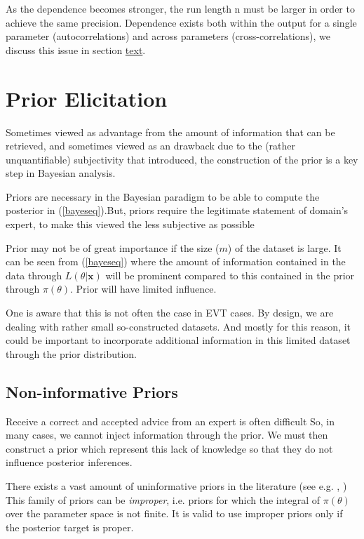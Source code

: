 \documentclass[11pt,a4paper,openany ]{book}
\begin{document}
As the dependence becomes stronger, the run length n must be larger in order
to achieve the same precision. Dependence exists both within the output for a single parameter
(autocorrelations) and across parameters (cross-correlations), we discuss this issue in section \hyperref[label]{text}.




\section{Prior Elicitation}

Sometimes viewed as advantage from the amount of information that can be retrieved, and sometimes viewed as an drawback due to the (rather unquantifiable) subjectivity that introduced, the construction of the prior is a key step in Bayesian analysis.


Priors are necessary in the Bayesian paradigm to be able to compute the posterior in  (\ref{bayeseq}).But, priors require the legitimate statement of domain's expert, to make this viewed the less subjective as possible

Prior may not be of great importance if the size ($m$) of the dataset is large. It can be seen from (\ref{bayeseq}) where the amount of information contained in the data through $L(\theta|\boldsymbol{x})$ will be prominent compared to this contained in the prior through $\pi(\theta)$. Prior will have limited influence.

One is aware that this is not often the case in EVT cases. By design, we are dealing with rather small so-constructed datasets. And mostly for this reason, it could be important to incorporate additional information in this limited dataset through the prior distribution.

\subsection{Non-informative Priors}

Receive a correct and accepted advice from an expert is often difficult
So, in many cases, we cannot inject information through the prior. 
We must then construct a prior which represent this lack of knowledge so that  they do not influence posterior inferences. 

There exists a vast amount of uninformative priors in the literature (see e.g. \cite{yang_catalog_1996}, \cite{ni_noninformative_2003})
This family of priors can be \emph{improper}, i.e. priors for which the integral of $\pi(\theta)$ over the parameter space is not finite. It is valid to use improper priors only if the posterior target is proper. 
\end{document}
